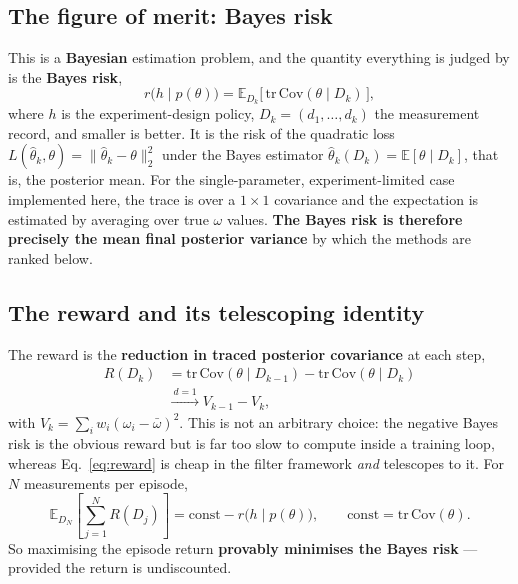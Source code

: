 \documentclass[12pt,a4paper]{article}
\begin{document}
\subsection{The figure of merit: Bayes risk}
\label{sec:bayes-risk}
This is a \textbf{Bayesian} estimation problem, and the quantity everything
is judged by is the \textbf{Bayes risk},
\begin{equation}
  r\bigl(h \mid p(\theta)\bigr) = \mathbb{E}_{D_k}\bigl[\,
  \mathrm{tr}\,\mathrm{Cov}(\theta \mid D_k) \,\bigr],
  \label{eq:bayes-risk}
\end{equation}
where $h$ is the experiment-design policy, $D_k = (d_1,\dots,d_k)$ the
measurement record, and smaller is better. It is the risk of the quadratic
loss $L(\hat\theta_k, \theta) = \lVert\hat\theta_k - \theta\rVert_2^{2}$
under the Bayes estimator $\hat\theta_k(D_k) = \mathbb{E}[\theta \mid D_k]$,
that is, the posterior mean. For the single-parameter, experiment-limited
case implemented here, the trace is over a $1\times1$ covariance and the
expectation is estimated by averaging over true $\omega$ values. \textbf{The
Bayes risk is therefore precisely the mean final posterior variance} by which
the methods are ranked below.

\subsection{The reward and its telescoping identity}
\label{sec:reward}
The reward is the \textbf{reduction in traced posterior covariance} at each
step,
\begin{align}
  R(D_k) &= \mathrm{tr}\,\mathrm{Cov}(\theta \mid D_{k-1})
            - \mathrm{tr}\,\mathrm{Cov}(\theta \mid D_k) \nonumber \\
         &\xrightarrow{\ d=1\ } V_{k-1} - V_k,
  \label{eq:reward}
\end{align}
with $V_k = \sum_i w_i(\omega_i - \bar\omega)^{2}$. This is not an arbitrary
choice: the negative Bayes risk is the obvious reward but is far too slow to
compute inside a training loop, whereas Eq.~\eqref{eq:reward} is cheap in the
filter framework \emph{and} telescopes to it. For $N$ measurements per
episode,
\begin{equation}
  \mathbb{E}_{D_N}\left[\sum_{j=1}^{N} R(D_j)\right]
    = \mathrm{const} - r\bigl(h \mid p(\theta)\bigr),
  \qquad \mathrm{const} = \mathrm{tr}\,\mathrm{Cov}(\theta).
  \label{eq:telescope}
\end{equation}
So maximising the episode return \textbf{provably minimises the Bayes
risk} --- provided the return is undiscounted.
\end{document}
